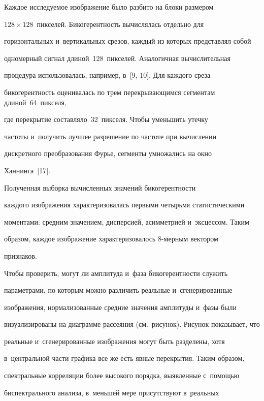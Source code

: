 

  Каждое исследуемое изоб\-ра\-же\-ние было разбито на блоки размером 


$128\times128$~пикселей. Би\-ко\-ге\-рен\-тность вы\-чис\-ля\-лась отдельно для 


горизонтальных и~вертикальных срезов, каждый из которых пред\-став\-лял собой 


одномерный сигнал длиной~128~пикселей. Аналогичная вычислительная 


процедура использовалась, например, в~[9, 10]. Для каждого среза 


бикогерентность оценивалась по трем перекрывающимся сегментам длиной~64~пикселя, 


где перекрытие составляло~32~пикселя. Чтобы уменьшить утечку 


частоты и~получить лучшее разрешение по частоте при вычислении 


дискретного преобразования Фурье, сегменты умножались на окно 


Ханнинга~[17]. 





Полученная выборка вычисленных значений бикогерентности 


каждого изоб\-ра\-же\-ния характеризовалась первыми четырьмя статистическими 


моментами: средним значением, дисперсией, асимметрией и~эксцессом. Таким 


образом, каждое изображение характеризовалось 8-мер\-ным вектором 


признаков.


  


   Чтобы проверить, могут ли амплитуда и~фаза бикогерентности служить 


параметрами, по которым можно различить реальные и~сгенерированные 


изображения, нормализованные средние значения амплитуды и~фазы были 


визуализированы на диаграмме рассеяния (см.\ рисунок). Рисунок показывает, что 


реальные и~сгенерированные изображения могут быть разделены, хотя 


в~центральной час\-ти графика все же есть явные перекрытия. Таким образом, 


спектральные корреляции более высокого порядка, выявленные с~по\-мощью 


биспектрального анализа, в~меньшей мере присутствуют в~реальных 


